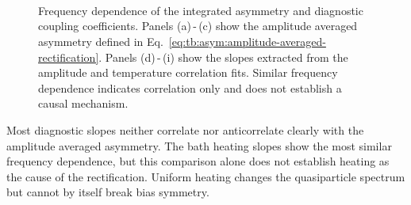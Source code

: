         \begin{figure}[p]
            \centering
            \setlength{\subfigcapskip}{3pt}
            \hfill
            \hfill
            \\
            \hfill
            \hfill
            \\
            \hfill
            \hfill
            \\
            \caption{
                Frequency dependence of the integrated asymmetry and diagnostic coupling coefficients. Panels (a)\,-\,(c) show the amplitude averaged asymmetry defined in Eq.~\eqref{eq:tb:asym:amplitude-averaged-rectification}. Panels (d)\,-\,(i) show the slopes extracted from the amplitude and temperature correlation fits. Similar frequency dependence indicates correlation only and does not establish a causal mechanism.
                }
            \label{fig:tb:asym:frequency}
        \end{figure}

        Most diagnostic slopes neither correlate nor anticorrelate clearly with the amplitude averaged asymmetry. The bath heating slopes show the most similar frequency dependence, but this comparison alone does not establish heating as the cause of the rectification. Uniform heating changes the quasiparticle spectrum but cannot by itself break bias symmetry.

